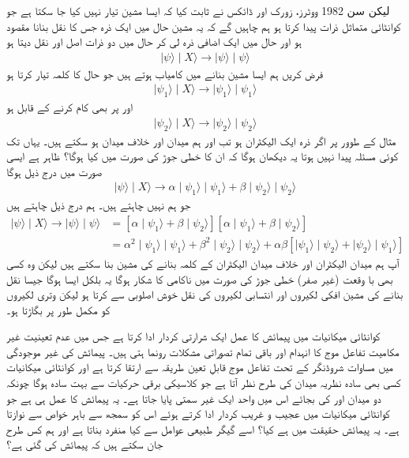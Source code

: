 لیکن سن \num{1982} ووٹرز، زورک اور ڈائکس نے ثابت کیا کہ ایسا مشین تیار نہیں کیا جا سکتا ہے جو کوانٹائی متماثل ذرات پیدا کرتا ہو ہم چاہیں گے کہ یہ مشین حال  میں ایک ذرہ جس کا نقل بنانا مقصود ہو اور حال  میں ایک اضافی ذرہ لی کر  حال  میں دو ذرات  اصل اور نقل دیتا ہو 
\begin{align}
	\mid\psi\rangle\mid X\rangle\to\mid\psi\rangle\mid\psi\rangle
\end{align}
فرض کریں ہم ایسا مشین بنانے میں کامیاب ہوتے ہیں جو حال  کا کلمہ تیار کرتا ہو 
\begin{align}
	\mid\psi_1\rangle\mid X\rangle\to\mid\psi_1\rangle\mid\psi_1\rangle
\end{align}
اور  پر بھی کام کرنے کے قابل ہو
\begin{align}
	\mid\psi_2\rangle\mid X\rangle\to\mid\psi_2\rangle\mid\psi_2\rangle
\end{align}
مثال کے طوور پر اگر ذرہ ایک الیکٹران ہو تب  اور  ہم میدان اور خلاف میدان ہو سکتے ہیں۔ یہاں تک کوئی مسئلہ پیدا نہیں ہوتا یہ دیکھان ہوگا کہ ان کا خطی جوڑ  کی صورت میں کیا ہوگا؟ ظاہر ہے ایسی صورت میں درج ذیل ہوگا
\begin{align}
	\mid\psi\rangle\mid X\rangle\to\alpha\mid\psi_1\rangle\mid\psi_1\rangle+\beta\mid\psi_2\rangle\mid\psi_2\rangle
\end{align}
جو ہم نہیں چاہتے ہیں۔ ہم درج ذیل چاہتے ہیں  
\begin{align}
	\mid\psi\rangle\mid X\rangle\to\mid\psi\rangle\mid\psi\rangle &= [\alpha\mid\psi_1\rangle+\beta\mid\psi_2\rangle][\alpha\mid\psi_1\rangle+\beta\mid\psi_2\rangle]\nonumber \\
	&= \alpha^2\mid\psi_1\rangle\mid\psi_1\rangle+\beta^2\mid\psi_2\rangle\mid\psi_2\rangle+\alpha\beta[\mid\psi_1\rangle\mid\psi_2\rangle+\mid\psi_2\rangle\mid\psi_1\rangle]
\end{align}
آپ ہم میدان الیکٹران اور خلاف میدان الیکٹران کے کلمہ بنانے کی مشین بنا سکتے ہیں لیکن وہ کسی بھی با وقعت (غیر صفر)  خطی جوڑ کی صورت میں ناکامی کا شکار ہوگا یہ بلکل ایسا ہوگا جیسا نقل بنانے کی مشین  افکی لکیروں اور انتسابی لکیروں کی نقل خوش اصلوبی سے کرتا ہو لیکن وتری لکیروں کو مکمل طور پر بگاڑتا ہو۔

کوانٹائی میکانیات میں پیمائش کا عمل ایک شرارتی کردار ادا کرتا ہے جس میں عدم تعینیت غیر مکامیت تفاعل موج کا انہدام اور باقی تمام تصوراتی مشکلات رونما ہتی ہیں۔ پیمائش کی غیر موجودگی میں مساوات شروڈنگر کے تحت تفاعل موج قابلِ تعین طریقہ سے ارتقا کرتا ہے اور کوانٹائی میکانیات کسی بھی سادہ نظریہ میدان کی طرح نظر آتا ہے جو کلاسیکی برقی حرکیات سے بہت سادہ ہوگا چونکہ دو میدان  اور  کی بجائے اس میں واحد ایک غیر سمتی  پایا جاتا ہے۔ یہ پیمائش کا عمل ہی ہے جو کوانٹائی میکانیات میں عجیب و غریب کردار ادا کرتے ہوئے اس کو سمجھ سے باہر خواص سے نوازتا ہے۔ یہ پیمائش حقیقت میں ہے کیا؟ اسے گیگر طبیعی عوامل سے کیا منفرد بناتا ہے اور ہم کس طرح جان سکتے ہیں کہ پیمائش کی گئی ہے؟

